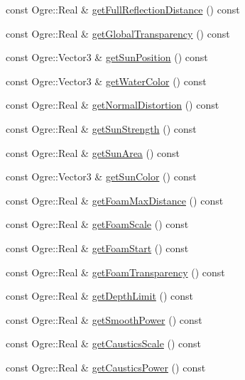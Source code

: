\begin{CompactItemize}
const Ogre::Real \& \hyperlink{class_hydrax_1_1_hydrax_ac55c7b84c7d6e067010526a91d1ee00}{getFullReflectionDistance} () const 
\item 
const Ogre::Real \& \hyperlink{class_hydrax_1_1_hydrax_9f71ca1190dd56802a9a0d5e6fe7b73d}{getGlobalTransparency} () const 
\item 
const Ogre::Vector3 \& \hyperlink{class_hydrax_1_1_hydrax_6391180e70faf46ee681466620a85f4d}{getSunPosition} () const 
\item 
const Ogre::Vector3 \& \hyperlink{class_hydrax_1_1_hydrax_0e0da539fe181e84a115368e97eff0c6}{getWaterColor} () const 
\item 
const Ogre::Real \& \hyperlink{class_hydrax_1_1_hydrax_129ecf4478ecca15299d9f25e9074b90}{getNormalDistortion} () const 
\item 
const Ogre::Real \& \hyperlink{class_hydrax_1_1_hydrax_acad398f575cb867b93eee4c7397c14b}{getSunStrength} () const 
\item 
const Ogre::Real \& \hyperlink{class_hydrax_1_1_hydrax_881b74b5c9a3c830317174cf610d6867}{getSunArea} () const 
\item 
const Ogre::Vector3 \& \hyperlink{class_hydrax_1_1_hydrax_7b40b2febde3f65bf5b2532a9cb752ff}{getSunColor} () const 
\item 
const Ogre::Real \& \hyperlink{class_hydrax_1_1_hydrax_942025a1a9f93e24221b618b4130732a}{getFoamMaxDistance} () const 
\item 
const Ogre::Real \& \hyperlink{class_hydrax_1_1_hydrax_23f873e4659628d36274dfce9a76bc5c}{getFoamScale} () const 
\item 
const Ogre::Real \& \hyperlink{class_hydrax_1_1_hydrax_a89f420e1adfd5bf578ba12fa0a3104e}{getFoamStart} () const 
\item 
const Ogre::Real \& \hyperlink{class_hydrax_1_1_hydrax_aa96bcad2550ec7eb1430a6af5a237d3}{getFoamTransparency} () const 
\item 
const Ogre::Real \& \hyperlink{class_hydrax_1_1_hydrax_03b8b82e6223f7e3ec47d845957ec5e3}{getDepthLimit} () const 
\item 
const Ogre::Real \& \hyperlink{class_hydrax_1_1_hydrax_aae88f80029fa6fd3b11e646ae740cd3}{getSmoothPower} () const 
\item 
const Ogre::Real \& \hyperlink{class_hydrax_1_1_hydrax_4e9359d0ee14a3f1aae1776b7144bfab}{getCausticsScale} () const 
\item 
const Ogre::Real \& \hyperlink{class_hydrax_1_1_hydrax_d857d60009cbc99335081bc65a25b719}{getCausticsPower} () const 
\item 

\end{CompactItemize}
